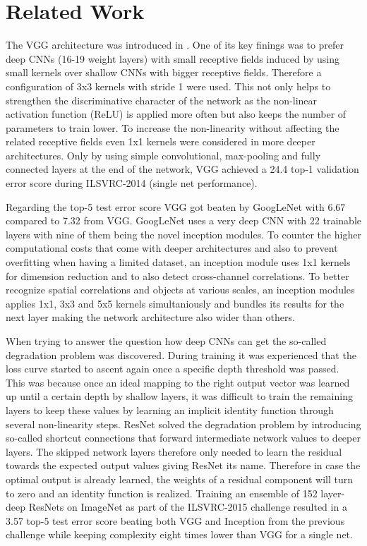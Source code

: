 \section{Related Work}

The VGG architecture was introduced in \cite{KarenSimonyan.2014}. One of its key finings was to prefer deep CNNs (16-19 weight layers) with small receptive fields induced by using small kernels over shallow CNNs with bigger receptive fields. Therefore a configuration of 3x3 kernels with stride 1 were used. This not only helps to strengthen the discriminative character of the network as the non-linear activation function (ReLU) is applied more often but also keeps the number of parameters to train lower. To increase the non-linearity without affecting the related receptive fields even 1x1 kernels were considered in more deeper architectures. Only by using simple convolutional, max-pooling and fully connected layers at the end of the network, VGG achieved a 24.4 top-1 validation error score during ILSVRC-2014 (single net performance). \cite{KarenSimonyan.2014}

Regarding the top-5 test error score VGG got beaten by GoogLeNet with 6.67 compared to 7.32 from VGG. GoogLeNet uses a very deep CNN with 22 trainable layers with nine of them being the novel inception modules. To counter the higher computational costs that come with deeper architectures and also to prevent overfitting when having a limited dataset, an inception module uses 1x1 kernels for dimension reduction and to also detect cross-channel correlations. To better recognize spatial correlations and objects at various scales, an inception modules applies 1x1, 3x3 and 5x5 kernels simultaniously and bundles its results for the next layer making the network architecture also wider than others. \cite{ChristianSzegedy.2014}

When trying to answer the question how deep CNNs can get the so-called degradation problem was discovered. During training it was experienced that the loss curve started to ascent again once a specific depth threshold was passed. This was because once an ideal mapping to the right output vector was learned up until a certain depth by shallow layers, it was difficult to train the remaining layers to keep these values by learning an implicit identity function through several non-linearity steps. ResNet solved the degradation problem by introducing so-called shortcut connections that forward intermediate network values to deeper layers. The skipped network layers therefore only needed to learn the residual towards the expected output values giving ResNet its name. Therefore in case the optimal output is already learned, the weights of a residual component will turn to zero and an identity function is realized. Training an ensemble of 152 layer-deep ResNets on ImageNet as part of the ILSVRC-2015 challenge resulted in a 3.57 top-5 test error score beating both VGG and Inception from the previous challenge while keeping complexity eight times lower  than VGG for a single net. \cite{KaimingHe.2015}

